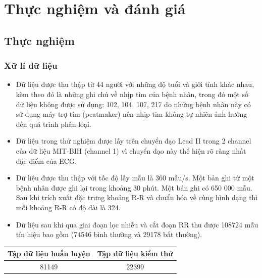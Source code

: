 \chapter{Thực nghiệm và đánh giá}
\thispagestyle{fancy}

\section{Thực nghiệm}

\subsection{Xữ lí dữ liệu}

\begin{itemize}
    \item Dữ liệu được thu thập từ 44 người với những độ tuổi và giới tính khác nhau, kèm theo đó là những ghi chú về nhịp tim của bệnh nhân, trong đó một số dữ liệu không được sử dụng: 102, 104, 107, 217 do những bệnh nhân này có sử dụng máy trợ tim (peatmaker) nên nhịp tim không tự nhiên ảnh hưởng đến quá trình phân loại.
    \item Dữ liệu trong thử nghiệm được lấy trên chuyển đạo Lead II trong 2 channel của dữ liệu MIT-BIH (channel 1) vì chuyển đạo này thể hiện rõ ràng nhất đặc điểm của ECG.
    \item Dữ liệu được thu thập với tốc độ lấy mẫu là 360 mẫu/s. Một bản ghi từ một bệnh nhân được ghi lại trong khoảng 30 phút. Một bản ghi có 650 000 mẫu. Sau khi trích xuất đặc trưng khoảng R-R và chuẩn hóa về cùng hình dạng thì mỗi khoảng R-R có độ dài là 324.
    \item Dữ liệu sau khi qua giai đoạn lọc nhiễu và cắt đoạn RR thu được 108724 mẫu tín hiệu bao gồm (74546 bình thường và 29178 bất thường).
\end{itemize}
\begin{center}
    \begin{tabular}{|c|c|}
    \hline 
    Tập dữ liệu huấn luyện & Tập dữ liệu kiểm thử \\ 
    \hline 
    81149 & 22399\\
    \hline 
    \end{tabular}
\end{center}

